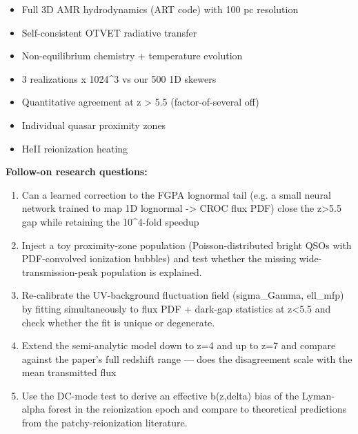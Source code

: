 \begin{itemize}[leftmargin=1.4em,itemsep=0.2em,topsep=0.2em]
\item Full 3D AMR hydrodynamics (ART code) with 100 pc resolution
\item Self-consistent OTVET radiative transfer
\item Non-equilibrium chemistry + temperature evolution
\item 3 realizations x 1024\textasciicircum{}3 vs our 500 1D skewers
\item Quantitative agreement at z \textgreater{} 5.5 (factor-of-several off)
\item Individual quasar proximity zones
\item HeII reionization heating
\end{itemize}\noindent\textbf{Follow-on research questions:}
\begin{enumerate}[leftmargin=1.6em,itemsep=0.2em,topsep=0.2em,label=Q\arabic*.]
\item Can a learned correction to the FGPA lognormal tail (e.g. a small neural network trained to map 1D lognormal -\textgreater{} CROC flux PDF) close the z\textgreater{}5.5 gap while retaining the 10\textasciicircum{}4-fold speedup
\item Inject a toy proximity-zone population (Poisson-distributed bright QSOs with PDF-convolved ionization bubbles) and test whether the missing wide-transmission-peak population is explained.
\item Re-calibrate the UV-background fluctuation field (sigma\_Gamma, ell\_mfp) by fitting simultaneously to flux PDF + dark-gap statistics at z\textless{}5.5 and check whether the fit is unique or degenerate.
\item Extend the semi-analytic model down to z=4 and up to z=7 and compare against the paper's full redshift range --- does the disagreement scale with the mean transmitted flux
\item Use the DC-mode test to derive an effective b(z,delta) bias of the Lyman-alpha forest in the reionization epoch and compare to theoretical predictions from the patchy-reionization literature.
\end{enumerate}


